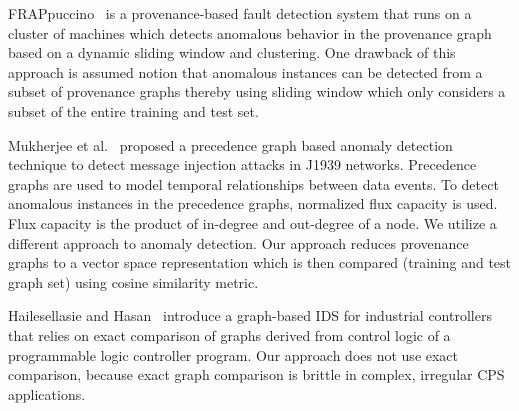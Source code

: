 FRAPpuccino~\cite{203308} is a provenance-based fault detection system that runs on a cluster of machines which detects anomalous behavior in the provenance graph based on a dynamic sliding window and clustering. One drawback of this approach is assumed notion that anomalous instances can be detected from a subset of provenance graphs thereby using sliding window which only considers a subset of the entire training and test set. 

Mukherjee et al.~\cite{Mukherjee2017APG} proposed a precedence graph based anomaly detection technique to detect message injection attacks in J1939 networks. Precedence graphs are used to model temporal relationships between data events. To detect anomalous instances in the precedence graphs, normalized flux capacity is used. Flux capacity is the product of in-degree and out-degree of a node. We utilize a different approach to anomaly detection. Our approach reduces provenance graphs to a vector space representation which is then compared (training and test graph set) using cosine similarity metric.

Hailesellasie and Hasan~\cite{hailesellasie_intrusion_2018} introduce a graph-based IDS for industrial controllers that relies on exact comparison of graphs derived from control logic of a programmable logic controller program. Our approach does not use exact comparison, because exact graph comparison is brittle in complex, irregular CPS applications.


















